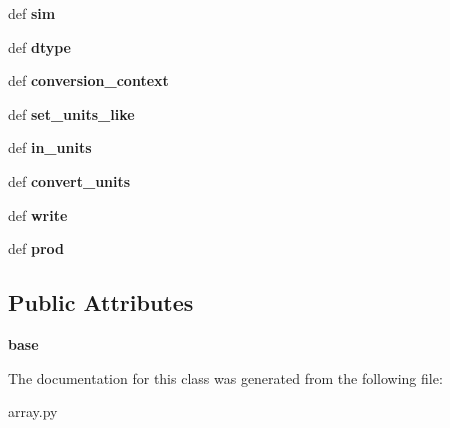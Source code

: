 \begin{DoxyCompactItemize}
\item 
\hypertarget{classseren3_1_1array_1_1IndexedSimArray_a7b5e56af883f6bea8a8e936a54f35050}{
def {\bfseries sim}}
\label{classseren3_1_1array_1_1IndexedSimArray_a7b5e56af883f6bea8a8e936a54f35050}

\item 
\hypertarget{classseren3_1_1array_1_1IndexedSimArray_a42ca6b6e847f2fe0e38e15daae95d18c}{
def {\bfseries dtype}}
\label{classseren3_1_1array_1_1IndexedSimArray_a42ca6b6e847f2fe0e38e15daae95d18c}

\item 
\hypertarget{classseren3_1_1array_1_1IndexedSimArray_adbd4250b2fdd7a340033e6221db5b797}{
def {\bfseries conversion\_\-context}}
\label{classseren3_1_1array_1_1IndexedSimArray_adbd4250b2fdd7a340033e6221db5b797}

\item 
\hypertarget{classseren3_1_1array_1_1IndexedSimArray_a72e20f4d8401ae1a3e16b870fb45deed}{
def {\bfseries set\_\-units\_\-like}}
\label{classseren3_1_1array_1_1IndexedSimArray_a72e20f4d8401ae1a3e16b870fb45deed}

\item 
\hypertarget{classseren3_1_1array_1_1IndexedSimArray_ad1384ab4bfd0375067b18f5efff0314b}{
def {\bfseries in\_\-units}}
\label{classseren3_1_1array_1_1IndexedSimArray_ad1384ab4bfd0375067b18f5efff0314b}

\item 
\hypertarget{classseren3_1_1array_1_1IndexedSimArray_a8b1b083bedc10dd868ee61d6bd9a6910}{
def {\bfseries convert\_\-units}}
\label{classseren3_1_1array_1_1IndexedSimArray_a8b1b083bedc10dd868ee61d6bd9a6910}

\item 
\hypertarget{classseren3_1_1array_1_1IndexedSimArray_aa2baf6c82f6f312960cf6958d2c59c7b}{
def {\bfseries write}}
\label{classseren3_1_1array_1_1IndexedSimArray_aa2baf6c82f6f312960cf6958d2c59c7b}

\item 
\hypertarget{classseren3_1_1array_1_1IndexedSimArray_a0871b4ce709f0d78c804c945310264a4}{
def {\bfseries prod}}
\label{classseren3_1_1array_1_1IndexedSimArray_a0871b4ce709f0d78c804c945310264a4}

\end{DoxyCompactItemize}
\subsection*{Public Attributes}
\begin{DoxyCompactItemize}
\item 
\hypertarget{classseren3_1_1array_1_1IndexedSimArray_ab493f8738dc2cd776f7563ad07825315}{
{\bfseries base}}
\label{classseren3_1_1array_1_1IndexedSimArray_ab493f8738dc2cd776f7563ad07825315}

\end{DoxyCompactItemize}


The documentation for this class was generated from the following file:\begin{DoxyCompactItemize}
\item 
array.py\end{DoxyCompactItemize}
